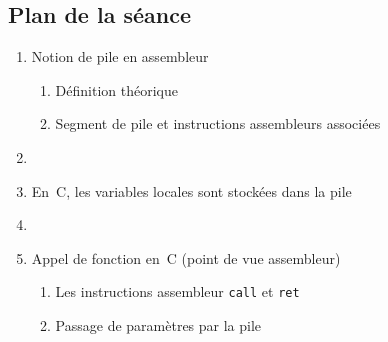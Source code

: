 
\begin{frame}
  \section{}%
\end{frame}


\begin{frame}
  \section{Plan de la s\'eance}%
  \begin{enumerate}
  \item Notion de pile en assembleur
    \begin{enumerate}
    \item D\'efinition th\'eorique
    \item Segment de pile et instructions assembleurs associ\'ees
    \end{enumerate}
\item[]
  \item En~C, les variables locales sont stock\'ees dans la pile
\item[]
  \item Appel de fonction en~C (point de vue assembleur)
    \begin{enumerate}
    \item Les instructions assembleur \texttt{call} et \texttt{ret}
    \item Passage de param\`etres par la pile
    \end{enumerate}
  \end{enumerate}    
\end{frame}
